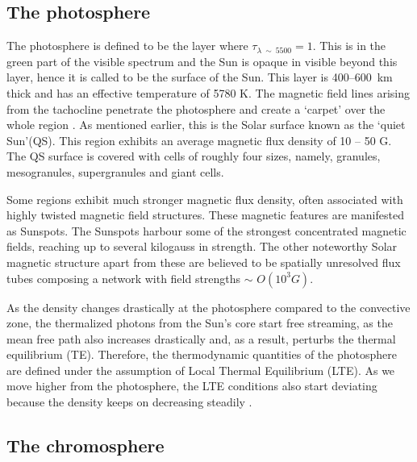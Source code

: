 \subsection{The photosphere}\label{photosphere}

The photosphere is defined to be the layer where $\tau_{\lambda~\sim~5500}=1$. This is in the green part of the visible spectrum and the Sun is opaque in visible beyond this layer, hence it is called to be the surface of the Sun. This layer is 400{--}600~km thick and has an effective temperature of 5780 K. The magnetic field lines arising from the tachocline penetrate the photosphere and create a `carpet' over the whole region \citep{priest14}. As mentioned earlier, this is the Solar surface known as the `quiet Sun'(QS). This region exhibits an average magnetic flux density of 10 {--} 50 G. The QS surface is covered with cells of roughly four sizes, namely, granules, mesogranules, supergranules and giant cells.

Some regions exhibit much stronger magnetic flux density, often associated with highly twisted magnetic field structures. These magnetic features are manifested as Sunspots. The Sunspots harbour some of the strongest concentrated magnetic fields, reaching up to several kilogauss in strength. The other noteworthy Solar magnetic structure apart from these are believed to be spatially unresolved flux tubes composing a network with field strengths $\sim$ {\it $O(10^{3} G)$}\citep{solanki93,grossman96,rubio19}.

As the density changes drastically at the photosphere compared to the convective zone, the thermalized photons from the Sun's core start free streaming, as the mean free path also increases drastically and, as a result, perturbs the thermal equilibrium (TE). Therefore, the thermodynamic quantities of the photosphere are defined under the assumption of Local Thermal Equilibrium (LTE). As we move higher from the photosphere, the LTE conditions also start deviating because the density keeps on decreasing steadily \citep{philips08}.

\subsection{The chromosphere}\label{chromosphere}

